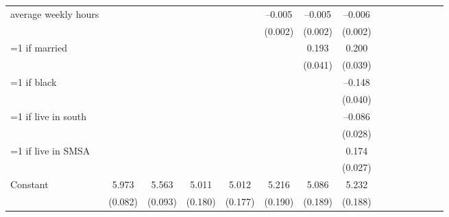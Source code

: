 \begin{center}
\begin{threeparttable}
\begin{tabular}{l*{7}{cc}}
average weekly hours&                     &                     &                     &                     &     --0.005\sym{**} &     --0.005\sym{***}&     --0.006\sym{***}\\
                    &                     &                     &                     &                     &     (0.002)         &     (0.002)         &     (0.002)         \\
=1 if married       &                     &                     &                     &                     &                     &       0.193\sym{***}&       0.200\sym{***}\\
                    &                     &                     &                     &                     &                     &     (0.041)         &     (0.039)         \\
=1 if black         &                     &                     &                     &                     &                     &                     &     --0.148\sym{***}\\
                    &                     &                     &                     &                     &                     &                     &     (0.040)         \\
=1 if live in south &                     &                     &                     &                     &                     &                     &     --0.086\sym{***}\\
                    &                     &                     &                     &                     &                     &                     &     (0.028)         \\
=1 if live in SMSA  &                     &                     &                     &                     &                     &                     &       0.174\sym{***}\\
                    &                     &                     &                     &                     &                     &                     &     (0.027)         \\
Constant            &       5.973\sym{***}&       5.563\sym{***}&       5.011\sym{***}&       5.012\sym{***}&       5.216\sym{***}&       5.086\sym{***}&       5.232\sym{***}\\
                    &     (0.082)         &     (0.093)         &     (0.180)         &     (0.177)         &     (0.190)         &     (0.189)         &     (0.188)         \\

\end{tabular}
\end{threeparttable}
\end{center}
